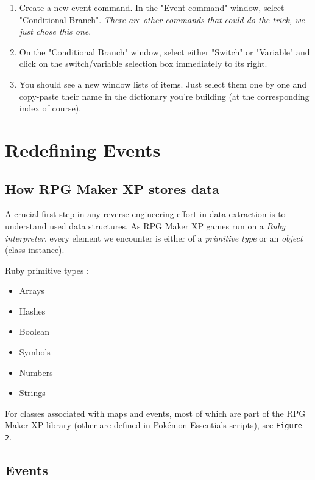 \documentclass[11pt]{article}
\begin{document}
{\begin{enumerate}
	\item Create a new event command. In the "Event command" window, select "Conditional Branch". \textit{There are other commands that could do the trick, we just chose this one}.
	
	\item On the "Conditional Branch" window, select either "Switch" or "Variable" and click on the switch/variable selection box immediately to its right.
	
	\item You should see a new window lists of items. Just select them one by one and copy-paste their name in the dictionary you're building (at the corresponding index of course).
\end{enumerate}






\newpage 
\section{Redefining Events}

\subsection{How RPG Maker XP stores data}

A crucial first step in any reverse-engineering effort in data extraction is to understand used data structures. As RPG Maker XP games run on a \textit{Ruby interpreter}, every element we encounter is either of a \textit{primitive type} or an \textit{object} (class instance).

Ruby primitive types :
\begin{itemize}
	\item Arrays
	\item Hashes
	\item Boolean
	\item Symbols
	\item Numbers
	\item Strings
	
\end{itemize}

\vspace{2mm}
For classes associated with maps and events, most of which are part of the RPG Maker XP library (other are defined in Pokémon Essentials scripts), see \texttt{Figure 2}.

\subsection{Events}

}
\end{document}
